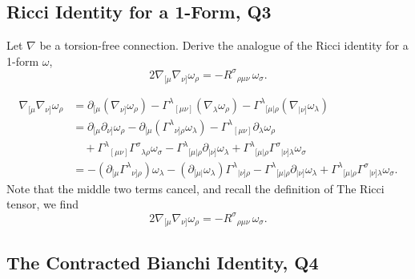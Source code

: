\subsection{Ricci Identity for a 1-Form, Q3}

Let $\nabla$ be a torsion-free connection. Derive the analogue of the Ricci identity for a 1-form $\omega$,
\begin{equation}
    2\nabla_{[\mu}\nabla_{\nu]}\omega_\rho = -R^\sigma{}_{\rho\mu\nu}\,\omega_\sigma.
\end{equation}

\begin{solution}
    \begin{equation}
        \begin{aligned}
            \nabla_{[\mu}\nabla_{\nu]}\omega_\rho 
            &= \partial_{[\mu}(\nabla_{\nu]}\omega_\rho) - \Gamma^\lambda{}_{[\mu\nu]}(\nabla_\lambda\omega_\rho) - \Gamma^\lambda{}_{[\mu|\rho}(\nabla_{|\nu]}\omega_\lambda)\\
            &=\partial_{{[\mu}}\partial_{\nu]}\omega_\rho - \partial_{{[\mu}}(\Gamma^\lambda{}_{\nu]\rho}\omega_\lambda) - \Gamma^\lambda{}_{[\mu\nu]}\partial_\lambda\omega_\rho \\
            &\quad+\Gamma^\lambda{}_{[\mu\nu]}\Gamma^\sigma{}_{\lambda\rho}\omega_\sigma - \Gamma^\lambda{}_{[\mu|\rho}\partial_{|\nu]}\omega_\lambda + \Gamma^\lambda{}_{[\mu|\rho}\Gamma^\sigma{}_{|\nu]\lambda}\omega_\sigma\\
            &=-(\partial_{{[\mu}}\Gamma^\lambda{}_{\nu]\rho})\omega_\lambda -(\partial_{{[\mu|}}\omega_\lambda)\Gamma^\lambda{}_{|\nu]\rho} - \Gamma^\lambda{}_{[\mu|\rho}\partial_{|\nu]}\omega_\lambda + \Gamma^\lambda{}_{[\mu|\rho}\Gamma^\sigma{}_{|\nu]\lambda}\omega_\sigma.
        \end{aligned}
    \end{equation}
    Note that the middle two terms cancel, and recall the definition of The Ricci tensor, we find
    \begin{equation}
        2\nabla_{[\mu}\nabla_{\nu]}\omega_\rho = -R^\sigma{}_{\rho\mu\nu}\,\omega_\sigma.
    \end{equation}
\end{solution}

\subsection{The Contracted Bianchi Identity, Q4}

